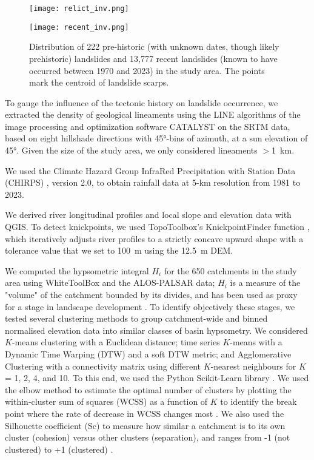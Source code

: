 \documentclass[draft]{agujournal2019}
\begin{document}
\begin{figure}[ht!]
  \begin{minipage}{.48\linewidth}
    \centering
    {\texttt{[image: relict\_inv.png]}}
   \end{minipage}\quad
   \begin{minipage}{.48\linewidth}
    \centering
      {\texttt{[image: recent\_inv.png]}}
  \end{minipage}
    \caption{Distribution of 222 pre-historic (with unknown dates, though likely prehistoric) landslides and 13,777 recent landslides (known to have occurred between 1970 and 2023) in the study area. The points mark the centroid of landslide scarps.}
    \label{fig:inventory}
\end{figure}

\par To gauge the influence of the tectonic history on landslide occurrence, we extracted the density of geological lineaments using the LINE algorithms of the image processing and optimization software CATALYST on the SRTM data, based on eight hillshade directions with 45°-bins of azimuth, at a sun elevation of 45°. Given the size of the study area, we only considered lineaments $>$1~km.  

\par We used the Climate Hazard Group InfraRed Precipitation with Station Data (CHIRPS) \cite{funk2015}, version 2.0, to obtain rainfall data at 5-km resolution from 1981 to 2023. 

\par We derived river longitudinal profiles and local slope and elevation data with QGIS. To detect knickpoints, we used TopoToolbox's KnickpointFinder function \cite{Schwanghart_2014}, which iteratively adjusts river profiles to a strictly concave upward shape with a tolerance value that we set to 100~m using the 12.5~m DEM. 

\par We computed the hypsometric integral $H_i$ for the 650 catchments in the study area using WhiteToolBox \cite{lindasy2014} and the ALOS-PALSAR data; $H_i$ is a measure of the "volume" of the catchment bounded by its divides, and has been used as proxy for a stage in landscape development \cite{Strahler1952, Gallen2011}. To identify objectively these stages, we tested several clustering methods to group catchment-wide and binned normalised elevation data into similar classes of basin hypsometry. We considered $K$-means clustering with a Euclidean distance; time series $K$-means with a Dynamic Time Warping (DTW) and a soft DTW metric; and Agglomerative Clustering with a connectivity matrix using different $K$-nearest neighbours for $K$ = 1, 2, 4, and 10. To this end, we used the Python Scikit-Learn library \cite{scikit-learn2011}. We used the elbow method to estimate the optimal number of clusters by plotting the within-cluster sum of squares (WCSS) as a function of $K$ to identify the break point where the rate of decrease in WCSS changes most \cite{thorndike1953}. We also used the Silhouette coefficient (Sc) to measure how similar a catchment is to its own cluster (cohesion) versus other clusters (separation), and ranges from -1 (not clustered) to +1 (clustered) \cite{rousseeuw1987}. 
\end{document}
